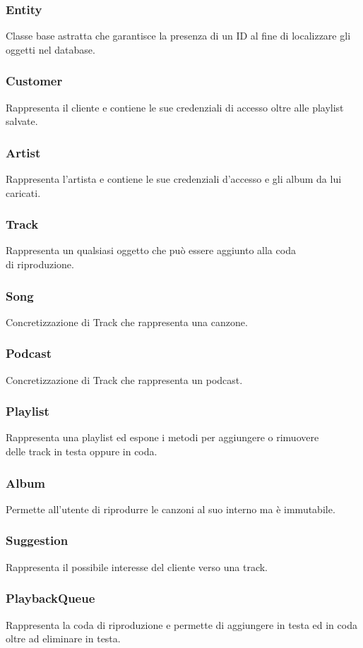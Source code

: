 \documentclass{article}
\begin{document}
\subsubsection{Entity}
Classe base astratta che garantisce la presenza di un ID al fine di localizzare gli oggetti nel database.
\subsubsection{Customer}
Rappresenta il cliente e contiene le sue credenziali di accesso oltre alle playlist salvate. 
\subsubsection{Artist}
Rappresenta l'artista e contiene le sue credenziali d'accesso e gli album da lui caricati.
\subsubsection{Track}
Rappresenta un qualsiasi oggetto che può essere aggiunto alla coda\\ di riproduzione.
\subsubsection{Song}
Concretizzazione di Track che rappresenta una canzone.
\subsubsection{Podcast}
Concretizzazione di Track che rappresenta un podcast.
\subsubsection{Playlist}
Rappresenta una playlist ed espone i metodi per aggiungere o rimuovere\\ delle track in testa oppure in coda.
\subsubsection{Album}
Permette all'utente di riprodurre le canzoni al suo interno ma è immutabile.
\subsubsection{Suggestion}
Rappresenta il possibile interesse del cliente verso una track.
\subsubsection{PlaybackQueue}
Rappresenta la coda di riproduzione e permette di aggiungere in testa ed in coda oltre ad eliminare in testa.
\end{document}
